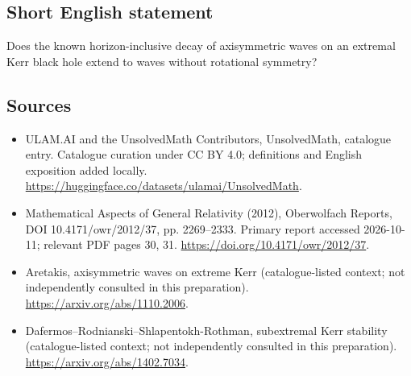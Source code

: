 \documentclass[11pt]{article}
\begin{document}
\subsection{Short English statement}
Does the known horizon-inclusive decay of axisymmetric waves on an extremal Kerr black hole extend to waves without rotational symmetry?
\subsection{Sources}
\begin{itemize}
\item[\hypertarget{source:statement:1}{S1}] ULAM.AI and the UnsolvedMath Contributors, UnsolvedMath, catalogue entry. Catalogue curation under CC BY 4.0; definitions and English exposition added locally.
\url{https://huggingface.co/datasets/ulamai/UnsolvedMath}.
\item[\hypertarget{source:statement:2}{S2}] Mathematical Aspects of General Relativity (2012), Oberwolfach Reports, DOI 10.4171/owr/2012/37, pp. 2269--2333. Primary report accessed 2026-10-11; relevant PDF pages 30, 31.
\url{https://doi.org/10.4171/owr/2012/37}.
\item[\hypertarget{source:statement:3}{S3}] Aretakis, axisymmetric waves on extreme Kerr (catalogue-listed context; not independently consulted in this preparation).
\url{https://arxiv.org/abs/1110.2006}.
\item[\hypertarget{source:statement:4}{S4}] Dafermos--Rodnianski--Shlapentokh-Rothman, subextremal Kerr stability (catalogue-listed context; not independently consulted in this preparation).
\url{https://arxiv.org/abs/1402.7034}.
\end{itemize}
\label{end:statement}
\end{document}

